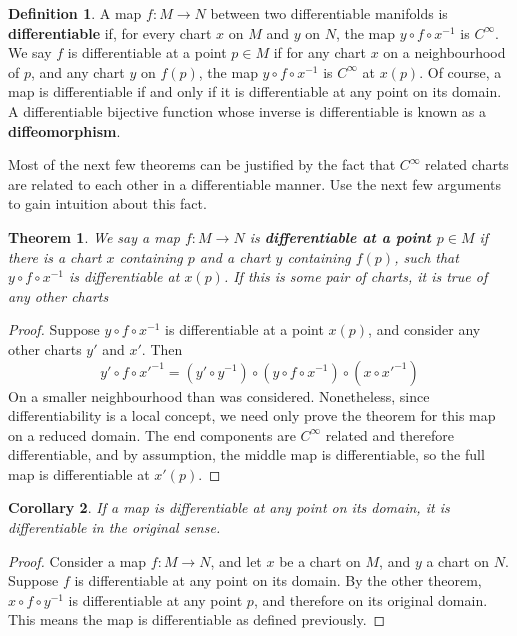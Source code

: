 \documentclass[12pt]{report}
\theoremstyle{plain}
\newtheorem{theorem}{Theorem}[chapter]
\newtheorem{corollary}[theorem]{Corollary}
\theoremstyle{definition}
\newtheorem*{defi}{Definition}
\newenvironment{definition}
    {\begin{samepage}\begin{framed}\begin{defi}}
    {\end{defi}\end{framed}\end{samepage}}
\begin{document}
\begin{definition}
    A map $f:M \to N$ between two differentiable manifolds is {\bf differentiable} if, for every chart $x$ on $M$ and $y$ on $N$, the map $y \circ f \circ x^{-1}$ is $C^\infty$. We say $f$ is differentiable at a point $p \in M$ if for any chart $x$ on a neighbourhood of $p$, and any chart $y$ on $f(p)$, the map $y \circ f \circ x^{-1}$ is $C^\infty$ at $x(p)$. Of course, a map is differentiable if and only if it is differentiable at any point on its domain. A differentiable bijective function whose inverse is differentiable is known as a {\bf diffeomorphism}.
\end{definition}

Most of the next few theorems can be justified by the fact that $C^\infty$ related charts are related to each other in a differentiable manner. Use the next few arguments to gain intuition about this fact.

\begin{theorem}
    We say a map $f:M \to N$ is {\bf differentiable at a point $p \in M$} if there is a chart $x$ containing $p$ and a chart $y$ containing $f(p)$, such that $y \circ f \circ x^{-1}$ is differentiable at $x(p)$. If this is some pair of charts, it is true of any other charts
\end{theorem}
\begin{proof}
    Suppose $y \circ f \circ x^{-1}$ is differentiable at a point $x(p)$, and consider any other charts $y'$ and $x'$. Then
    \[ y' \circ f \circ x'^{-1} = (y' \circ y^{-1}) \circ (y \circ f \circ x^{-1}) \circ (x \circ x'^{-1}) \]
    On a smaller neighbourhood than was considered. Nonetheless, since differentiability is a local concept, we need only prove the theorem for this map on a reduced domain. The end components are $C^\infty$ related and therefore differentiable, and by assumption, the middle map is differentiable, so the full map is differentiable at $x'(p)$.
\end{proof}

\begin{corollary}
    If a map is differentiable at any point on its domain, it is differentiable in the original sense.
\end{corollary}
\begin{proof}
    Consider a map $f:M \to N$, and let $x$ be a chart on $M$, and $y$ a chart on $N$. Suppose $f$ is differentiable at any point on its domain. By the other theorem, $x \circ f \circ y^{-1}$ is differentiable at any point $p$, and therefore on its original domain. This means the map is differentiable as defined previously.
\end{proof}
\end{document}
